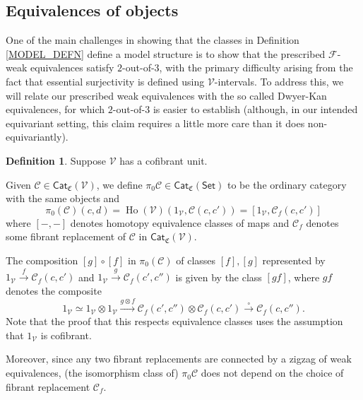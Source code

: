 \documentclass[a4paper,10pt
,draft
]{article}%
\numberwithin{equation}{section}
\numberwithin{figure}{section}
\theoremstyle{definition} %
\newtheorem{definition}[equation]{Definition}%
\newtheorem{remark}[equation]{Remark}%
\newcommand{\Cat}{\mathsf{Cat}}
\DeclareMathOperator{\Ho}{Ho}
\newcommand{\F}{\ensuremath{\mathcal F}}
\newcommand{\V}{\ensuremath{\mathcal V}}
\newcommand{\1}{\ensuremath{\mathbbm 1}}%
\begin{document}
\subsection{Equivalences of objects}\label{EQUIVOBJ_SEC}

One of the main challenges in showing that the classes in Definition \ref{MODEL_DEFN} define a model structure
is to show that the prescribed 
$\F$-weak equivalences satisfy $2$-out-of-$3$,
with the primary difficulty arising from the fact that essential surjectivity is 
defined using $\V$-intervals.
To address this, we will relate our prescribed weak equivalences
with the so called Dwyer-Kan equivalences,
for which $2$-out-of-$3$ is easier to establish
(although, in our intended equivariant setting, 
this claim requires a little more care than it does non-equivariantly).



\begin{definition}\label{HTPY_DEFN}
	Suppose $\V$ has a cofibrant unit.

	Given $\mathcal C \in \Cat_{\mathfrak{C}}(\V)$,
	we define $\pi_0 \mathcal C \in \Cat_{\mathfrak{C}}(\mathsf{Set})$ 
	to be the ordinary category with the same objects and
\[
	\pi_0(\mathcal{C})(c,d)=
	\Ho(\V)(1_\V, \mathcal C(c,c'))=
	[1_\V, \mathcal{C}_f(c,c')]
\]
where $[-,-]$ denotes homotopy equivalence classes of maps
and $\mathcal{C}_f$ denotes some fibrant replacement of
$\mathcal C$ in $\Cat_{\mathfrak{C}}(\V)$.
\end{definition}


The composition $[g]\circ [f]$
in $\pi_0(\mathcal{C})$
of classes $[f],[g]$
represented by
$1_{\mathcal{V}} \xrightarrow{f} \mathcal{C}_f({c,c'})$
and 
$1_{\mathcal{V}} \xrightarrow{g} \mathcal{C}_f({c',c''})$
is given by the class $[gf]$, where $gf$ denotes the composite
\[
	1_{\mathcal{V}} \simeq
	1_{\mathcal{V}} \otimes 1_{\mathcal{V}} \xrightarrow{g \otimes f}
	\mathcal{C}_f({c',c''}) \otimes  \mathcal{C}_f({c,c'}) \xrightarrow{\circ}
	\mathcal{C}_f({c,c''}).
\]
Note that the proof that this respects equivalence classes uses the assumption that $1_{\mathcal{V}}$ is cofibrant.

Moreover, since any two fibrant replacements are connected by a zigzag of weak equivalences,
(the isomorphism class of) $\pi_0 \mathcal{C}$ does not depend on the choice of fibrant replacement $\mathcal{C}_f$.
\end{document}

